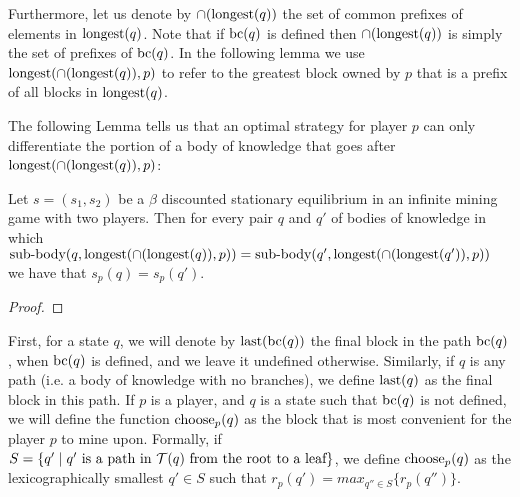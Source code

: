 Furthermore, let us denote by $\cap({\text{\rm longest}}(q))$ the set of common prefixes of elements in ${\text{\rm longest}}(q)$. Note that 
if $\text{bc}(q)$ is defined then $\cap({\text{\rm longest}}(q))$ is simply the set of prefixes of $\text{bc}(q)$. 
In the following lemma we use ${\text{\rm longest}}(\cap({\text{\rm longest}}(q)),p)$ to refer to the greatest block owned by $p$ that 
is a prefix of all blocks in ${\text{\rm longest}}(q)$. 

The following Lemma tells us that an optimal strategy for player $p$ can only differentiate the portion of 
a body of knowledge that goes after ${\text{\rm longest}}(\cap({\text{\rm longest}}(q)),p)$: 

\begin{mylem}
Let $s = (s_1,s_2)$ be a $\beta$ discounted stationary equilibrium in an infinite mining game with two players. 
Then for every pair $q$ and $q'$ of 
bodies of knowledge in which ${\text{\rm sub-body}}(q,{\text{\rm longest}}(\cap({\text{\rm longest}}(q)),p)) = {\text{\rm sub-body}}(q',{\text{\rm longest}}(\cap({\text{\rm longest}}(q')),p))$ we have that 
$s_p(q) = s_p(q')$. 
\end{mylem}

\begin{proof}
\end{proof}


\bigskip



First, for a state $q$, we will denote by $\text{\rm last}(\text{bc}(q))$ the final block in the path $\text{bc}(q)$, when $\text{bc}(q)$ is defined, and we leave it undefined otherwise. Similarly, if $q$ is any path (i.e. a body of knowledge with no branches), we define $\text{\rm last}(q)$ as the final block in this path. If $p$ is a player, and $q$ is a state such that $\text{bc}(q)$ is not defined, we will define the function $\text{\rm choose}_p(q)$ as the block that is most convenient for the player $p$ to mine upon. Formally, if $S=\{ q'\mid q' \text{ is a path in } \mathcal{T}(q) \text{ from the root to a leaf}\}$, we define $\text{\rm choose}_p(q)$ as the lexicographically smallest $q'\in S$ such that $r_p(q')=max_{q''\in S} \{r_p(q'')\}$.

%
%
%
%
%
%


